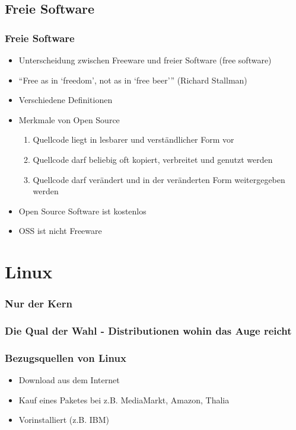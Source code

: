 \documentclass[compress]{beamer}
\begin{document}
\subsection{Freie Software}
\begin{frame}
	\frametitle{Freie Software}
	\begin{itemize}
		\item Unterscheidung zwischen Freeware und freier 
			Software (free software)
		\item “Free as in ‘freedom’, not as in ‘free beer’”
			(Richard Stallman)
		\item Verschiedene Definitionen 
		\item Merkmale von Open Source
		\begin{enumerate}
			\item Quellcode liegt in lesbarer und verständlicher Form vor
			\item Quellcode darf beliebig oft kopiert, verbreitet und 
				genutzt werden
			\item Quellcode darf verändert und in der veränderten Form 
				weitergegeben werden
		\end{enumerate}
		\item Open Source Software ist kostenlos
		\item OSS ist nicht Freeware
	\end{itemize}
\end{frame}

\section{Linux}

\begin{frame}
	\frametitle{Nur der Kern}
\end{frame}

\begin{frame}
	\frametitle{Die Qual der Wahl - Distributionen wohin das Auge reicht}
\end{frame}

\begin{frame}
	\frametitle{Bezugsquellen von Linux}
	\begin{itemize}
		\item Download aus dem Internet
		\item Kauf eines Paketes bei z.B. MediaMarkt, Amazon, Thalia
		\item Vorinstalliert (z.B. IBM)
	\end{itemize}
\end{frame}
\end{document}
